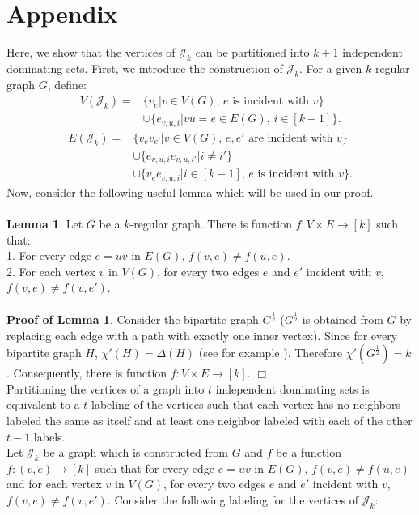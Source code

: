 \documentclass[
final
]{dmtcs-episciences}
\begin{document}
\section{Appendix}
Here, we show that the vertices of $\mathcal{J}_k$ can be partitioned into $k+1$ independent dominating sets.
First, we introduce the construction of $\mathcal{J}_k$. For a given $k$-regular graph $G$, define:
\begin{align*}
V(\mathcal{J}_k)= &  \{v_{e}| v\in V(G), \, e \text{ is incident with }v\}\\
                  &  \cup \{e_{v,u,i}| vu=e\in E(G),\,  i\in [k-1]\}.
\end{align*}
\begin{align*}
 E(\mathcal{J}_k)=  &\{v_e v_{e'}| v\in V(G),\, e,e' \text{ are incident with }v\}\\
                    &\cup \{e_{v,u,i}e_{v,u,i'}| i\neq i'\}\\
                    &\cup \{v_{e} e_{v,u,i}|i\in [k-1],\,  e \text{ is incident with }v \}.
\end{align*}
Now, consider the following useful lemma which will be used in our proof.
\\ \\
{\bf Lemma 1}. Let $G$ be a $k$-regular graph. There is function $f:V\times E\rightarrow [k]$ such that:\\
1. For every edge $e=uv$ in $E(G)$, $f(v,e)\neq f(u,e)$.\\
2. For each vertex $v$ in $V(G)$, for every two edges $e$ and $e'$ incident with $v$, $f(v,e)\neq f(v,e')$.
\\ \\
{\bf Proof of Lemma 1}. Consider the bipartite graph $G^{\frac{1}{2}}$ ($G^{\frac{1}{2}}$ is obtained from $G$ by replacing each edge with a path with
exactly one inner vertex).   Since for every bipartite  graph $H$, $\chi'(H)=\Delta(H)$ (see for example \cite{MR1367739}). Therefore $\chi'(G^{\frac{1}{2}})=k$. Consequently, there is function $f:V\times E\rightarrow [k]$. $\Box$
\\

Partitioning the vertices of a graph into $t$ independent dominating sets is equivalent to a $t$-labeling of the vertices such that each vertex has no neighbors labeled the same as itself and at least one neighbor labeled with each of the other $t-1$ labels.\\
Let $\mathcal{J}_k$ be a graph which is constructed from $G$ and $f$ be a function $f:(v,e)\rightarrow [k]$ such that for every edge $e=uv$ in $E(G)$, $f(v,e)\neq f(u,e)$ and for each vertex $v$ in $V(G)$, for every two edges $e$ and $e'$ incident with $v$, $f(v,e)\neq f(v,e')$.
Consider the following  labeling for the vertices of  $\mathcal{J}_k$:
\end{document}
